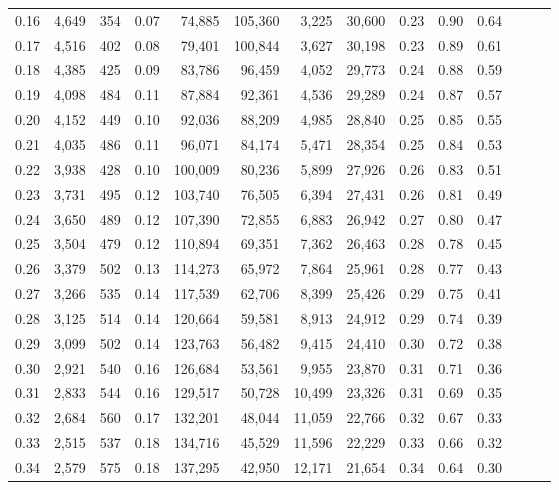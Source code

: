 \begin{tabular}{rrrrrrrrrrrrrr}
0.16 &  4,649 &  354 &  0.07 &   74,885 &  105,360 &   3,225 &  30,600 &  0.23 &  0.90 &      0.64 \\
0.17 &  4,516 &  402 &  0.08 &   79,401 &  100,844 &   3,627 &  30,198 &  0.23 &  0.89 &      0.61 \\
0.18 &  4,385 &  425 &  0.09 &   83,786 &   96,459 &   4,052 &  29,773 &  0.24 &  0.88 &      0.59 \\
0.19 &  4,098 &  484 &  0.11 &   87,884 &   92,361 &   4,536 &  29,289 &  0.24 &  0.87 &      0.57 \\
0.20 &  4,152 &  449 &  0.10 &   92,036 &   88,209 &   4,985 &  28,840 &  0.25 &  0.85 &      0.55 \\
0.21 &  4,035 &  486 &  0.11 &   96,071 &   84,174 &   5,471 &  28,354 &  0.25 &  0.84 &      0.53 \\
0.22 &  3,938 &  428 &  0.10 &  100,009 &   80,236 &   5,899 &  27,926 &  0.26 &  0.83 &      0.51 \\
0.23 &  3,731 &  495 &  0.12 &  103,740 &   76,505 &   6,394 &  27,431 &  0.26 &  0.81 &      0.49 \\
0.24 &  3,650 &  489 &  0.12 &  107,390 &   72,855 &   6,883 &  26,942 &  0.27 &  0.80 &      0.47 \\
0.25 &  3,504 &  479 &  0.12 &  110,894 &   69,351 &   7,362 &  26,463 &  0.28 &  0.78 &      0.45 \\
0.26 &  3,379 &  502 &  0.13 &  114,273 &   65,972 &   7,864 &  25,961 &  0.28 &  0.77 &      0.43 \\
0.27 &  3,266 &  535 &  0.14 &  117,539 &   62,706 &   8,399 &  25,426 &  0.29 &  0.75 &      0.41 \\
0.28 &  3,125 &  514 &  0.14 &  120,664 &   59,581 &   8,913 &  24,912 &  0.29 &  0.74 &      0.39 \\
0.29 &  3,099 &  502 &  0.14 &  123,763 &   56,482 &   9,415 &  24,410 &  0.30 &  0.72 &      0.38 \\
0.30 &  2,921 &  540 &  0.16 &  126,684 &   53,561 &   9,955 &  23,870 &  0.31 &  0.71 &      0.36 \\
0.31 &  2,833 &  544 &  0.16 &  129,517 &   50,728 &  10,499 &  23,326 &  0.31 &  0.69 &      0.35 \\
0.32 &  2,684 &  560 &  0.17 &  132,201 &   48,044 &  11,059 &  22,766 &  0.32 &  0.67 &      0.33 \\
0.33 &  2,515 &  537 &  0.18 &  134,716 &   45,529 &  11,596 &  22,229 &  0.33 &  0.66 &      0.32 \\
0.34 &  2,579 &  575 &  0.18 &  137,295 &   42,950 &  12,171 &  21,654 &  0.34 &  0.64 &      0.30 \\

\end{tabular}
